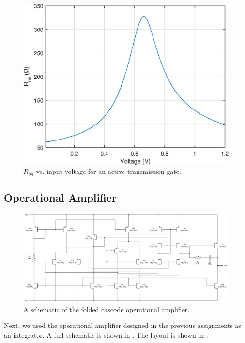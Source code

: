 \documentclass[journal,hidelinks]{IEEEtran}
\begin{document}
\begin{figure}[!htb]
  \centering
  \includegraphics[width=0.8\columnwidth]{circuit/transmission_gate/ron.eps}
  \caption{$R_{on}$ vs. input voltage for an active transmission gate.}
  \label{fig:transmission_gate_ron}
\end{figure}

\subsection{Operational Amplifier}

\begin{figure}[!htb]
  \centering
  \includegraphics[width=\textwidth]{diagrams/folded_cascode.pdf}
  \caption{A schematic of the folded cascode operational amplifier.}
  \label{fig:folded_cascode}
\end{figure}

Next, we used the operational amplifier designed in the previous assignments as an integrator. A full schematic is shown in . The layout is shown in .
\end{document}
